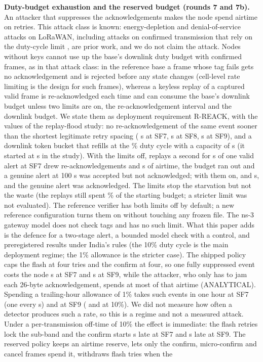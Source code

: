 \documentclass{ieeeaccess}
\begin{document}
\textbf{Duty-budget exhaustion and the reserved budget (rounds 7 and 7b).} An attacker that suppresses the acknowledgements makes the node spend airtime on retries. This attack class is known: energy-depletion and denial-of-service attacks on LoRaWAN, including attacks on confirmed transmission that rely on the duty-cycle limit \cite{R7Mikhaylov2019,R7Nafees2020,R7EdaLora2026,R7MacDos2023}, are prior work, and we do not claim the attack. Nodes without keys cannot use up the base's downlink duty budget with confirmed frames, as in that attack class: in the reference base a frame whose tag fails gets no acknowledgement and is rejected before any state changes (cell-level rate limiting is the design for such frames), whereas a keyless replay of a captured valid frame is re-acknowledged each time and can consume the base's downlink budget unless two limits are on, the re-acknowledgement interval and the downlink budget. We state them as deployment requirement R-REACK, with the values of the replay-flood study: no re-acknowledgement of the same event sooner than the shortest legitimate retry spacing (\RsevdIntervalSeven{} s at SF7, \RsevdIntervalEight{} s at SF8, \RsevdIntervalNine{} s at SF9), and a downlink token bucket that refills at the \RsevdDutyPct\% duty cycle with a capacity of \RsevdCapacity{} s (it started at \RsevdInitial{} s in the study). With the limits off, \RsevdRate{} replays a second for \RsevdDuration{} s of one valid alert at SF7 drew \RsevdOffReacks{} re-acknowledgements and \RsevdOffAirtime{} s of airtime, the budget ran out and a genuine alert at 100 s was accepted but not acknowledged; with them on, \RsevdOnReacks{} and \RsevdOnAirtime{} s, and the genuine alert was acknowledged. The limits stop the starvation but not the waste (the replays still spent \RsevdOnShare\% of the starting budget; a stricter limit was not evaluated). The reference verifier has both limits off by default; a new reference configuration turns them on without touching any frozen file. The ns-3 gateway model does not check tags and has no such limit. What this paper adds is the defence for a two-stage alert, a bounded model check with a control, and preregistered results under India's rules (the 10\% duty cycle is the main deployment regime; the 1\% allowance is the stricter case). The shipped policy caps the flash at four tries and the confirm at four, so one fully suppressed event costs the node \RsevNodeAirSfSeven{} s at SF7 and \RsevNodeAirSfNine{} s at SF9, while the attacker, who only has to jam each 26-byte acknowledgement, spends at most \RsevAttackRatioSfSeven{} of that airtime (ANALYTICAL). Spending a trailing-hour allowance of 1\% takes \RsevNstarOneSfSeven{} such events in one hour at SF7 (one every \RsevGapSfSeven{} s) and \RsevNstarOneSfNine{} at SF9 (\RsevNstarTenSfSeven{} and \RsevNstarTenSfNine{} at 10\%). We did not measure how often a detector produces such a rate, so this is a regime and not a measured attack. Under a per-transmission off-time of 10\% the effect is immediate: the flash retries lock the sub-band and the confirm starts \RsevTtenOldDelaySfSeven{} s late at SF7 and \RsevTtenOldDelaySfNine{} s late at SF9. The reserved policy keeps an airtime reserve, lets only the confirm, micro-confirm and cancel frames spend it, withdraws flash tries when the 
\end{document}
